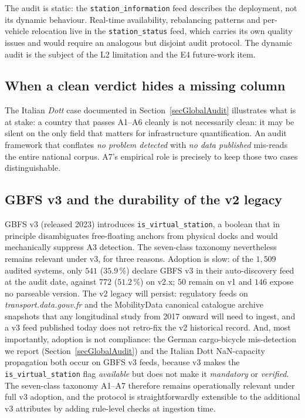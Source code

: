 \documentclass[11pt,a4paper]{article}
\begin{document}
The audit is static: the
\texttt{station\_information} feed describes the deployment, not
its dynamic behaviour. Real-time availability, rebalancing
patterns and per-vehicle relocation live in the
\texttt{station\_status} feed, which carries its own quality
issues and would require an analogous but disjoint audit
protocol. The dynamic audit is the subject of the L2 limitation
and the E4 future-work item.

\subsection{When a clean verdict hides a missing column}
The Italian \emph{Dott} case documented in
Section~\ref{secGlobalAudit} illustrates what is at stake: a country
that passes A1--A6 cleanly is not necessarily clean: it may be
silent on the only field that matters for infrastructure
quantification. An audit framework that conflates \emph{no problem
detected} with \emph{no data published} mis-reads the entire national
corpus. A7's empirical role is precisely to keep those two cases
distinguishable.

\subsection{GBFS v3 and the durability of the v2 legacy}
GBFS v3 (released 2023) introduces \texttt{is\_virtual\_station},
a boolean that in principle disambiguates free-floating anchors
from physical docks and would mechanically suppress A3 detection.
The seven-class taxonomy nevertheless remains relevant under v3, for
three reasons. Adoption is slow: of the $1{,}509$ audited systems,
only $541$ ($35.9\,\%$) declare GBFS v3 in their auto-discovery feed at the
audit date, against $772$ ($51.2\,\%$) on v2.x; $50$ remain on v1 and $146$
expose no parseable version. The v2 legacy will persist:
regulatory feeds on \emph{transport.data.gouv.fr} and the MobilityData
canonical catalogue archive snapshots that any longitudinal study from
2017 onward will need to ingest, and a v3 feed published today does not
retro-fix the v2 historical record. And, most importantly,
adoption is not compliance: the German cargo-bicycle mis-detection
we report
(Section~\ref{secGlobalAudit}) and the Italian Dott NaN-capacity
propagation both occur on GBFS v3 feeds, because v3 makes the
\texttt{is\_virtual\_station} flag \emph{available} but does not
make it \emph{mandatory} or \emph{verified}. The seven-class
taxonomy A1--A7 therefore remains operationally relevant under
full v3 adoption, and the protocol is straightforwardly extensible
to the additional v3 attributes by adding rule-level checks at
ingestion time.
\end{document}
